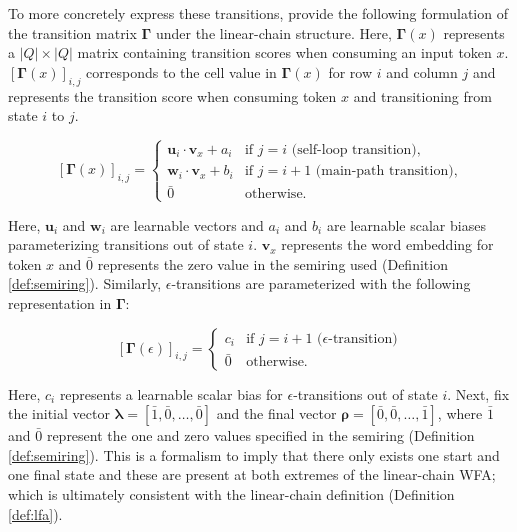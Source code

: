 To more concretely express these transitions, \citet{schwartz2018sopa} provide
the following formulation of the transition matrix $\bm{\Gamma}$ under the
linear-chain structure. Here, $\bm{\Gamma}(x)$ represents a $|Q|\times|Q|$ matrix
containing transition scores when consuming an input token $x$. $[\bm{\Gamma}(x)]_{i,j}$
corresponds to the cell value in $\bm{\Gamma}(x)$ for row $i$ and column
$j$ and represents the transition score when consuming token $x$ and
transitioning from state $i$ to $j$.

\begin{equation}
  \label{eq:sopa_transition_matrix_main}
  [\bm{\Gamma}(x)]_{i,j} =
  \begin{cases}
    \bm{u}_i \cdot \bm{v}_x + a_i  & \text{if } j = i \text{ (self-loop transition),} \\
    \bm{w}_i \cdot \bm{v}_x + b_i  & \text{if } j = i + 1 \text{ (main-path transition),} \\
    \bar{0} & \text{otherwise.}
  \end{cases}
\end{equation}

Here, $\bm{u}_i$ and $\bm{w}_i$ are learnable vectors and $a_i$ and $b_i$ are
learnable scalar biases parameterizing transitions out of state $i$. $\bm{v}_x$
represents the word embedding for token $x$ and $\bar{0}$ represents the zero
value in the semiring used (Definition \ref{def:semiring}). Similarly,
$\epsilon$-transitions are parameterized with the following representation in
$\bm{\Gamma}$:

\begin{equation}
  \label{eq:sopa_transition_matrix_epsilon}
  [\bm{\Gamma}(\epsilon)]_{i,j} =
  \begin{cases}
    c_i  & \text{if } j = i + 1 \text{ ($\epsilon$-transition)} \\
    \bar{0} & \text{otherwise.}
  \end{cases}
\end{equation}

Here, $c_i$ represents a learnable scalar bias for $\epsilon$-transitions out of state
$i$. Next, \citet{schwartz2018sopa} fix the initial vector $\bm{\lambda} = [\bar{1},
\bar{0}, \ldots, \bar{0}]$ and the final vector $\bm{\rho} = [\bar{0}, \bar{0},
\ldots, \bar{1}]$, where $\bar{1}$ and $\bar{0}$ represent the one and zero
values specified in the semiring (Definition \ref{def:semiring}). This is a
formalism to imply that there only exists one start and one final state
and these are present at both extremes of the linear-chain WFA; which is ultimately
consistent with the linear-chain definition (Definition \ref{def:lfa}).

